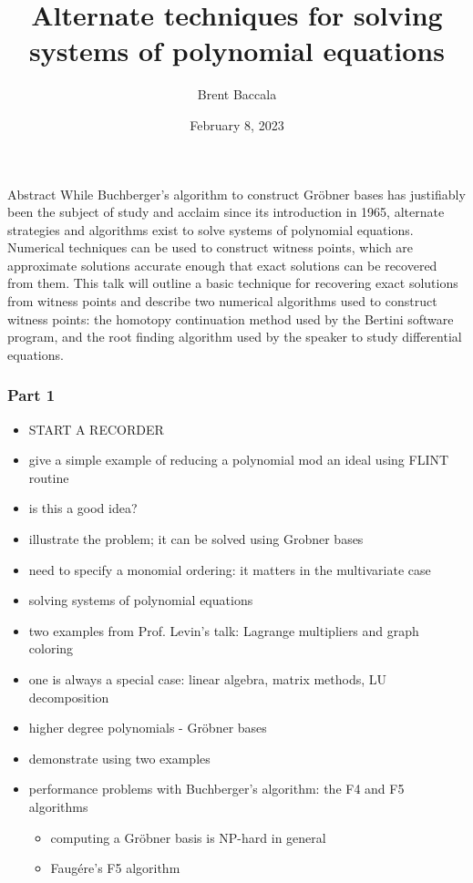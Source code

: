 \documentclass{beamer}
\title{Alternate techniques for solving systems of polynomial equations}
\author{Brent Baccala}
\institute{\tt cosine@freesoft.org}
\date{February 8, 2023}
\begin{document}
\begin{frame}
\titlepage
\begin{block}{Abstract}
\tiny
While Buchberger's algorithm to construct Gr\"obner bases has justifiably been the subject of study and acclaim since its introduction in 1965, alternate strategies and algorithms exist to solve systems of polynomial equations.  Numerical techniques can be used to construct witness points, which are approximate solutions accurate enough that exact solutions can be recovered from them.  This talk will outline a basic technique for recovering exact solutions from witness points and describe two numerical algorithms used to construct witness points: the homotopy continuation method used by the Bertini software program, and the root finding algorithm used by the speaker to study differential equations.
\end{block}
\end{frame}

\begin{frame}
\frametitle{Part 1}
\begin{itemize}
\item START A RECORDER
\item give a simple example of reducing a polynomial mod an ideal using FLINT routine
\item is this a good idea?
\item illustrate the problem; it can be solved using Grobner bases
\item need to specify a monomial ordering: it matters in the multivariate case

\item solving systems of polynomial equations
\item two examples from Prof. Levin's talk: Lagrange multipliers and graph coloring
\item one is always a special case: linear algebra, matrix methods, LU decomposition
\item higher degree polynomials - Gr\"obner bases
\item demonstrate using two examples

\item performance problems with Buchberger's algorithm: the F4 and F5 algorithms
\begin{itemize}
   \item computing a Gr\"obner basis is NP-hard in general
   \item Faug\'ere's F5 algorithm
\end{itemize}
\end{itemize}
\end{frame}
\end{document}

